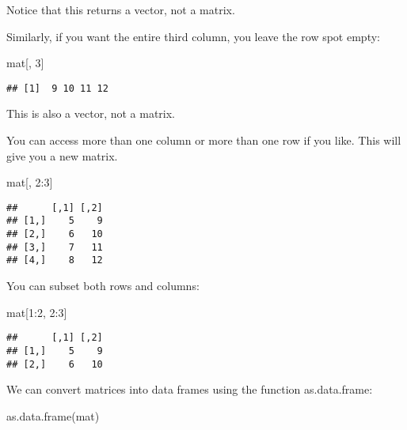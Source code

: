 \documentclass[
]{article}
\newenvironment{Shaded}{\begin{snugshade}}{\end{snugshade}}
\newcommand{\DecValTok}[1]{\textcolor[rgb]{0.00,0.00,0.81}{#1}}
\newcommand{\FunctionTok}[1]{\textcolor[rgb]{0.00,0.00,0.00}{#1}}
\newcommand{\NormalTok}[1]{#1}
\newcommand{\SpecialCharTok}[1]{\textcolor[rgb]{0.00,0.00,0.00}{#1}}
\begin{document}
Notice that this returns a vector, not a matrix.

Similarly, if you want the entire third column, you leave the row spot
empty:

\begin{Shaded}
\begin{Highlighting}[]
\NormalTok{mat[, }\DecValTok{3}\NormalTok{]}
\end{Highlighting}
\end{Shaded}

\begin{verbatim}
## [1]  9 10 11 12
\end{verbatim}

This is also a vector, not a matrix.

You can access more than one column or more than one row if you like.
This will give you a new matrix.

\begin{Shaded}
\begin{Highlighting}[]
\NormalTok{mat[, }\DecValTok{2}\SpecialCharTok{:}\DecValTok{3}\NormalTok{]}
\end{Highlighting}
\end{Shaded}

\begin{verbatim}
##      [,1] [,2]
## [1,]    5    9
## [2,]    6   10
## [3,]    7   11
## [4,]    8   12
\end{verbatim}

You can subset both rows and columns:

\begin{Shaded}
\begin{Highlighting}[]
\NormalTok{mat[}\DecValTok{1}\SpecialCharTok{:}\DecValTok{2}\NormalTok{, }\DecValTok{2}\SpecialCharTok{:}\DecValTok{3}\NormalTok{]}
\end{Highlighting}
\end{Shaded}

\begin{verbatim}
##      [,1] [,2]
## [1,]    5    9
## [2,]    6   10
\end{verbatim}

We can convert matrices into data frames using the function
as.data.frame:

\begin{Shaded}
\begin{Highlighting}[]
\FunctionTok{as.data.frame}\NormalTok{(mat)}
\end{Highlighting}
\end{Shaded}
\end{document}
